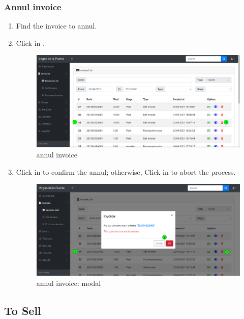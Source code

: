 \documentclass[a4paper,11pt]{refart}
\begin{document}
\subsubsection{Annul invoice}
\begin{enumerate}
	\item Find the invoice to annul.
	\item Click in .
	\begin{figure}[H]\centering
		\includegraphics[width=\textwidth]{images/invoice_list-annul.png}
		\caption{annul invoice}
		\label{fig:invoice_list-annul}
	\end{figure}
	\item Click in  to confirm the annul; otherwise, Click in  to abort the process.
	\begin{figure}[H]\centering
		\includegraphics[width=\textwidth]{images/invoice_list-annul-modal.png}
		\caption{annul invoice: modal}
		\label{fig:invoice_list-annul-modal}
	\end{figure}
\end{enumerate}

\subsection{To Sell}\label{section:to_sell}
\end{document}

